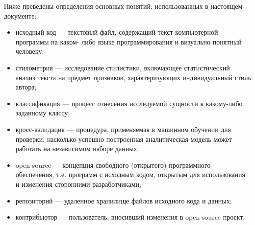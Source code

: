 Ниже преведены определения основных понятий, использованных в настоящем документе:
\begin{itemize}
 \item исходный код --- текстовый файл, содержащий текст компьютерной программы на каком-
 либо языке программирования и визуально понятный человеку;
 \item стилометрия --- исследование стилистики, включающее статистический анализ текста на предмет признаков,
 характеризующих индивидуальный стиль автора;
 \item классификация --- процесс отнесения исследуемой сущности к какому-либо заданному классу;
 \item кросс-валидация --- процедура, применяемая в машинном обучении для проверки, насколько успешно
 построенная аналитическая модель может работать на независимом наборе данных;
 \item open-source --- концепция свободного (открытого) программного обеспечения, т.е. программ с исходным кодом,
 открытым для использования и изменения сторонними разработчиками;
 \item репозиторий --- удаленное хранилище файлов исходного кода и данных;
 \item контрибьютор --- пользователь, вносивший изменения в open-source проект. 
\end{itemize}
